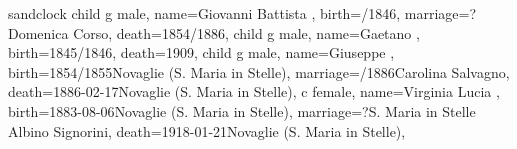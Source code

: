 \documentclass{article}
\begin{document}
\begin{midpage}
\begin{center}

\begin{genealogypicture}[
    processing=database,
    database format=full,
    node size=3.8cm,
    level size=2.8cm,
    level distance=6mm,
    list separators hang=3mm,
    name font=\bfseries,
    surn code={\textcolor{black!50!black}{#1}},
    place text={\newline}{},
    date format=d month yyyy,
    tcbset={male/.style={colframe=blue,colback=blue!5},
    female/.style={colframe=red,colback=red!5}},
    box={fit basedim=7pt,boxsep=2pt,segmentation style=solid,
        halign=left,before upper=\parskip1pt,
        \gtrDBsex,
    },
]
sandclock
{
    child{
        g{
            male,
            name={Giovanni Battista },
            birth={/1846}{},
            marriage={?}{Domenica Corso},
            death={1854/1886}{},
        }
        child{
            g{
                male,
                name={Gaetano },
                birth={1845/1846}{},
                death={1909}{},
            }
        }
        child{
            g{
                male,
                name={Giuseppe },
                birth={1854/1855}{Novaglie (S. Maria in Stelle)},
                marriage={/1886}{Carolina Salvagno},
                death={1886-02-17}{Novaglie (S. Maria in Stelle)},
            }
            c{
                female,
                name={Virginia Lucia },
                birth={1883-08-06}{Novaglie (S. Maria in Stelle)},
                marriage={?}{S. Maria in Stelle \newline Albino Signorini},
                death={1918-01-21}{Novaglie (S. Maria in Stelle)},
            }
        }
    }
}
\end{genealogypicture}

\end{center}
\end{midpage}
\end{document}
